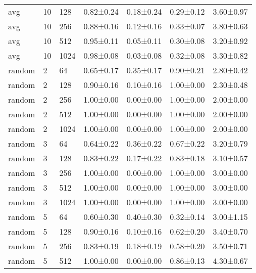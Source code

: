 \begin{tabular}{lllcccc}
avg      & 10           & 128                 & 0.82±0.24  & 0.18±0.24              & 0.29±0.12 & 3.60±0.97 \\
avg      & 10           & 256                 & 0.88±0.16  & 0.12±0.16              & 0.33±0.07 & 3.80±0.63 \\
avg      & 10           & 512                 & 0.95±0.11  & 0.05±0.11              & 0.30±0.08 & 3.20±0.92 \\
avg      & 10           & 1024                & 0.98±0.08  & 0.03±0.08              & 0.32±0.08 & 3.30±0.82 \\
\midrule
random   & 2            & 64                  & 0.65±0.17  & 0.35±0.17              & 0.90±0.21 & 2.80±0.42 \\
random   & 2            & 128                 & 0.90±0.16  & 0.10±0.16              & 1.00±0.00 & 2.30±0.48 \\
random   & 2            & 256                 & 1.00±0.00  & 0.00±0.00              & 1.00±0.00 & 2.00±0.00 \\
random   & 2            & 512                 & 1.00±0.00  & 0.00±0.00              & 1.00±0.00 & 2.00±0.00 \\
random   & 2            & 1024                & 1.00±0.00  & 0.00±0.00              & 1.00±0.00 & 2.00±0.00 \\
random   & 3            & 64                  & 0.64±0.22  & 0.36±0.22              & 0.67±0.22 & 3.20±0.79 \\
random   & 3            & 128                 & 0.83±0.22  & 0.17±0.22              & 0.83±0.18 & 3.10±0.57 \\
random   & 3            & 256                 & 1.00±0.00  & 0.00±0.00              & 1.00±0.00 & 3.00±0.00 \\
random   & 3            & 512                 & 1.00±0.00  & 0.00±0.00              & 1.00±0.00 & 3.00±0.00 \\
random   & 3            & 1024                & 1.00±0.00  & 0.00±0.00              & 1.00±0.00 & 3.00±0.00 \\
random   & 5            & 64                  & 0.60±0.30  & 0.40±0.30              & 0.32±0.14 & 3.00±1.15 \\
random   & 5            & 128                 & 0.90±0.16  & 0.10±0.16              & 0.62±0.20 & 3.40±0.70 \\
random   & 5            & 256                 & 0.83±0.19  & 0.18±0.19              & 0.58±0.20 & 3.50±0.71 \\
random   & 5            & 512                 & 1.00±0.00  & 0.00±0.00              & 0.86±0.13 & 4.30±0.67 \\

\end{tabular}
